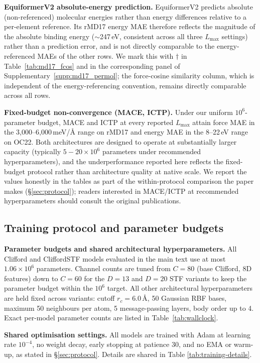 \textbf{EquiformerV2 absolute-energy prediction.} EquiformerV2 predicts absolute (non-referenced) molecular energies rather than energy differences relative to a per-element reference. Its rMD17 energy MAE therefore reflects the magnitude of the absolute binding energy ($\sim$247\,eV, consistent across all three $L_{\max}$ settings) rather than a prediction error, and is not directly comparable to the energy-referenced MAEs of the other rows. We mark this with $\dagger$ in Table~\ref{tab:md17_fcos} and in the corresponding panel of Supplementary~\ref{supp:md17_permol}; the force-cosine similarity column, which is independent of the energy-referencing convention, remains directly comparable across all rows.

\textbf{Fixed-budget non-convergence (MACE, ICTP).} Under our uniform $10^6$-parameter budget, MACE and ICTP at every reported $L_{\max}$ attain force MAE in the 3{,}000--6{,}000\,meV/\AA{} range on rMD17 and energy MAE in the 8--22\,eV range on OC22. Both architectures are designed to operate at substantially larger capacity (typically $5{-}20\times 10^6$ parameters under recommended hyperparameters), and the underperformance reported here reflects the fixed-budget protocol rather than architecture quality at native scale. We report the values honestly in the tables as part of the within-protocol comparison the paper makes (\S\ref{sec:protocol}); readers interested in MACE/ICTP at recommended hyperparameters should consult the original publications.

\subsection{Training protocol and parameter budgets}\label{supp:protocol}

\textbf{Parameter budgets and shared architectural hyperparameters.} All Clifford and CliffordSTF models evaluated in the main text use at most $1.06\times 10^6$ parameters. Channel counts are tuned from $C{=}80$ (base Clifford, 8D features) down to $C{=}60$ for the $D{=}13$ and $D{=}20$ STF variants to keep the parameter budget within the $10^6$ target. All other architectural hyperparameters are held fixed across variants: cutoff $r_c = 6.0$\,\AA, 50 Gaussian RBF bases, maximum 50 neighbours per atom, 5 message-passing layers, body order up to 4. Exact per-model parameter counts are listed in Table~\ref{tab:wallclock}.

\textbf{Shared optimisation settings.} All models are trained with Adam at learning rate $10^{-4}$, no weight decay, early stopping at patience 30, and no EMA or warm-up, as stated in \S\ref{sec:protocol}. Details are shared in Table \ref{tab:training-details}.


